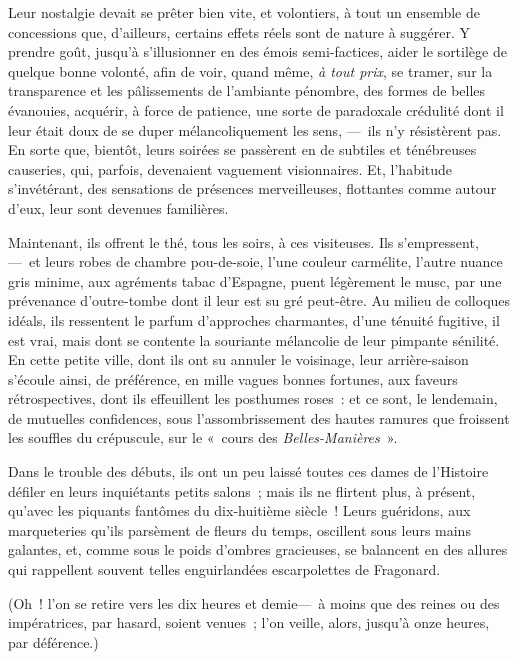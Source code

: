 \documentclass[french,twoside]{book} %
\begin{document}
Leur nostalgie devait se prêter bien vite, et   volontiers, à tout un ensemble de concessions que, d’ailleurs, certains effets réels sont de nature à suggérer. Y prendre goût, jusqu’à s’illusionner en des émois semi-factices, aider le sortilège de quelque bonne volonté, afin de voir, quand même, \emph{à tout prix}, se tramer, sur la transparence et les pâlissements de l’ambiante pénombre, des formes de belles évanouies, acquérir, à force de patience, une sorte de paradoxale crédulité dont il leur était doux de se duper mélancoliquement les sens, — ils n’y résistèrent pas. En sorte que, bientôt, leurs soirées se passèrent en de subtiles et ténébreuses causeries, qui, parfois, devenaient vaguement visionnaires. Et, l’habitude s’invétérant, des sensations de présences merveilleuses, flottantes comme autour d’eux, leur sont devenues familières.\par
Maintenant, ils offrent le thé, tous les soirs, à ces visiteuses. Ils s’empressent, — et leurs robes de chambre pou-de-soie, l’une couleur carmélite, l’autre nuance gris minime, aux agréments tabac d’Espagne, puent légèrement le musc, par une   prévenance d’outre-tombe dont il leur est su gré peut-être. Au milieu de colloques idéals, ils ressentent le parfum d’approches charmantes, d’une ténuité fugitive, il est vrai, mais dont se contente la souriante mélancolie de leur pimpante sénilité. En cette petite ville, dont ils ont su annuler le voisinage, leur arrière-saison s’écoule ainsi, de préférence, en mille vagues bonnes fortunes, aux faveurs rétrospectives, dont ils effeuillent les posthumes roses : et ce sont, le lendemain, de mutuelles confidences, sous l’assombrissement des hautes ramures que froissent les souffles du crépuscule, sur le « cours des \emph{Belles-Manières} ».\par
Dans le trouble des débuts, ils ont un peu laissé toutes ces dames de l’Histoire défiler en leurs inquiétants petits salons ; mais ils ne flirtent plus, à présent, qu’avec les piquants fantômes du dix-huitième siècle ! Leurs guéridons, aux marqueteries qu’ils parsèment de fleurs du temps, oscillent sous leurs mains galantes, et, comme sous le poids d’ombres gracieuses, se balancent en des allures qui rappellent   souvent telles enguirlandées escarpolettes de Fragonard.\par
(Oh ! l’on se retire vers les dix heures et demie— à moins que des reines ou des impératrices, par hasard, soient venues ; l’on veille, alors, jusqu’à onze heures, par déférence.)\par
\end{document}
